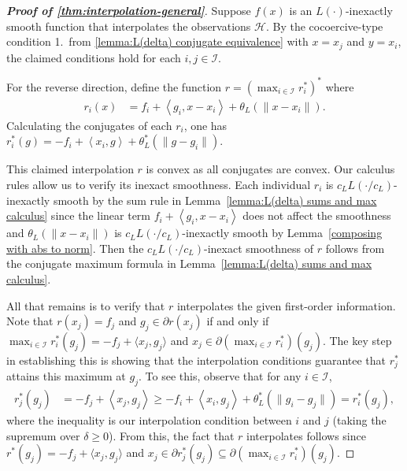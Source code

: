 \documentclass[11pt, hidelinks]{article}
\numberwithin{equation}{section}
\theoremstyle{thmstyletwo}%
\numberwithin{equation}{section}
\newcommand{\Ical}{\mathcal{I}}
\newcommand{\inner}[2]{\left\langle {#1}, {#2} \right\rangle}
\begin{document}
\begin{proof}[{\bf Proof of \cref{thm:interpolation-general}}]
Suppose $f(x)$ is an $L(\cdot)$-inexactly smooth function that interpolates the observations $\mathcal{H}$. By the cocoercive-type condition 1.~from \cref{lemma:L(delta) conjugate equivalence} with $x = x_j$ and $y = x_i$, the claimed conditions hold for each $i, j \in \Ical$. 

For the reverse direction, define the function $r = (\max_{i\in \Ical} r_i^*)^*$ where
\begin{align*}
     r_i(x) &= f_i + \inner{g_i}{x-x_i}+\theta_L(\|x-x_i\|).
 \end{align*} 
 Calculating the conjugates of each $r_i$, one has $r_i^*(g) = -f_i + \inner{x_i}{g}+\theta_L^*(\|g-g_i\|) $.
 
 This claimed interpolation $r$ is convex as all conjugates are convex. Our calculus rules allow us to verify its inexact smoothness. Each individual $r_i$ is $c_L L(\cdot/c_L)$-inexactly smooth by the sum rule in Lemma~\ref{lemma:L(delta) sums and max calculus} since the linear term $f_i + \inner{g_i}{x-x_i}$ does not affect the smoothness and $\theta_L(\|x-x_i\|)$ is $c_L L(\cdot/c_L)$-inexactly smooth by Lemma~\ref{composing with abs to norm}. Then the $c_L L(\cdot/c_L)$-inexact smoothness of $r$ follows from the conjugate maximum formula in Lemma~\ref{lemma:L(delta) sums and max calculus}.

 All that remains is to verify that $r$ interpolates the given first-order information. Note that $r(x_j) = f_j$ and $g_j\in\partial r(x_j)$ if and only if $\max_{i\in \Ical} r_i^*(g_j) = -f_j+\langle x_j,g_j\rangle$ and $x_j \in \partial (\max_{i\in \Ical} r_i^*)(g_j)$. The key step in establishing this is showing that the interpolation conditions guarantee that $r_j^*$ attains this maximum at $g_j$. To see this, observe that for any $i\in\Ical$,
 \begin{align*}
     r_j^*(g_j) &= -f_j + \inner{x_j}{g_j}
     \geq -f_i + \inner{x_i}{g_j}+\theta_L^*(\|g_i-g_j\|)
     =r_i^*(g_j),
 \end{align*}
 where the inequality is our interpolation condition between $i$ and $j$ (taking the supremum over $\delta \geq 0$).
 From this, the fact that $r$ interpolates follows since $r^*(g_j)=-f_j+\langle x_j,g_j\rangle$ and $x_j \in \partial r_j^*(g_j)\subseteq \partial (\max_{i\in \Ical} r_i^*)(g_j)$.
\end{proof}
\end{document}
